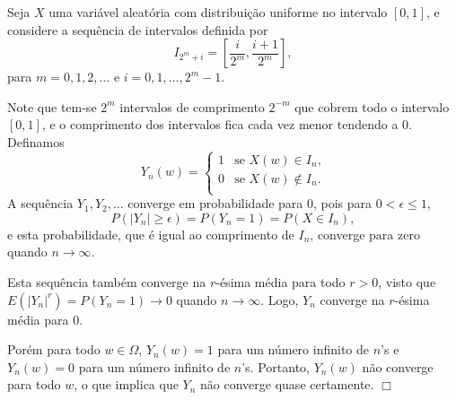 \begin{frame}
\begin{exem}
Seja $X$ uma variável aleatória com distribuição uniforme no
intervalo $[0,1]$, e considere a sequência de intervalos definida
por
$$I_{2^m+i}=[\frac{i}{2^m},\frac{i+1}{2^m}],$$
para $m=0,1,2,\ldots$ e $i=0,1,\ldots,2^m-1$.

Note que tem-se $2^m$ intervalos de comprimento $2^{-m}$ que cobrem
todo o intervalo $[0,1]$, e o comprimento dos intervalos fica cada
vez menor tendendo a 0. Definamos
%
\[
Y_n(w)= \left\{
\begin{array}{ll}
1 & \mbox{se $X(w)\in I_n$,} \\
0 & \mbox{se $X(w)\notin I_n$.} \\
\end{array}
\right.
\]
%
%
%
%
A sequência $Y_1,Y_2,\ldots$ converge em probabilidade para 0, pois
para $0<\epsilon\leq 1$,
%
$$P(|Y_n|\geq \epsilon)=P(Y_n=1)=P(X\in I_n),$$
%
e esta probabilidade, que é igual ao comprimento de $I_n$, converge
para zero quando $n\rightarrow \infty$.

Esta sequência também converge na $r$-ésima média para todo $r>0$,
visto que $E(|Y_n|^r)=P(Y_n=1)\rightarrow 0$ quando
$n\rightarrow\infty$. Logo, $Y_n$ converge na $r$-ésima média para
0.

Porém para todo $w\in\Omega$, $Y_n(w)=1$ para um número infinito de
$n$'s e $Y_n(w)=0$ para um número infinito de $n$'s. Portanto,
$Y_n(w)$ não converge para todo $w$, o que implica que $Y_n$ não
converge quase certamente. $\Box$
\end{exem}
%
%
\end{frame}
%
